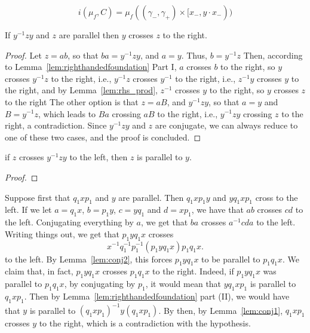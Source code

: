     \[
       i(\mu_f,C) = \mu_f((\gamma_-,\gamma_+) \times [x_-,y \cdot x_-))
    \] 
    
    \begin{claim}
If $y^{-1}zy$ and $z$ are parallel then $y$ crosses $z$ to the right.
\label{lem:conj1}
\end{claim}
\begin{proof}
Let $z=ab$, so that $ba=y^{-1}z y$, and $a=y$. Thus, $b=y^{-1}z$
Then, according to Lemma~\ref{lem:righthandedfoundation} Part I, $a$ crosses $b$ to the right, so $y$ crosses $y^{-1}z$ to the right, i.e., $y^{-1}z$ crosses $y^{-1}$ to the right, i.e., $z^{-1}y$ crosses $y$ to the right, and by Lemma~\ref{lem:rhs_prod}, $z^{-1}$ crosses $y$ to the right, so $y$ crosses $z$ to the right
The other option is that $z=aB$, and $y^{-1}z y$, so that $a=y$ and $B=y^{-1}z$, which leads to $Ba$ crossing $aB$ to the right, i.e., $y^{-1}zy$ crossing $z$ to the right, a contradiction.
Since $y^{-1}zy$ and $z$ are conjugate, we can always reduce to one of these two cases, and the proof is concluded. 
\end{proof}

\begin{claim}
 if $z$ crosses $y^{-1} z y$ to the left, then $z$ is parallel to $y$.
 \label{lem:conj2}
\end{claim}
\begin{proof}
\end{proof}
    
    
    Suppose first that $q_1 x p_1$ and $y$ are parallel. 
Then $q_1 x p_1 y$ and $y q_1 x p_1$ cross to the left.
If we let $a=q_1x$, $b=p_1 y$, $c=yq_1$ and $d=xp_1$, we have that
$ab$ crosses $cd$ to the left. Conjugating everything by $a$, we get that $ba$ crosses $a^{-1}cda$ to the left. 
Writing things out, we get that $p_1 y q_1 x$ crosses
\[
x^{-1}q_1^{-1}p_1^{-1} (p_1 y q_1 x) p_1 q_1 x.
\]
to the left.
By Lemma~\ref{lem:conj2}, this forces $p_1 y q_1 x$ to be parallel to $p_1q_1x$.
We claim that, in fact, $p_1 y q_1 x$ crosses $p_1q_1x$ to the right.
Indeed,  if $p_1 y q_1 x$  was parallel to $p_1q_1x$, by conjugating by $p_1$, it would mean that $y q_1 x p_1$ is parallel to $q_1 x p_1$.
Then by Lemma~\ref{lem:righthandedfoundation} part (II), we would have that 
$y$ is parallel to $(q_1 x p_1)^{-1} y (q_1 x p_1)$.
By then, by Lemma~\ref{lem:conj1}, $q_1 x p_1$ crosses $y$ to the right, which is a contradiction with the hypothesis.

